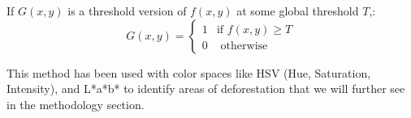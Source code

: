 \documentclass[12pt,a4paper,IEEEtran]{article}
\begin{document}
If $G(x,y)$ is a threshold version of $f(x,y)$ at some global threshold $T$,:
\[G(x,y) =
\begin{cases}
1 & \text{if } f(x,y) \geq T\\
0 & \text{ otherwise}
\end{cases}
\]

This method has been used with color spaces like HSV (Hue, Saturation, Intensity), and L*a*b* to identify areas of deforestation that we will further see in the methodology section.








\end{document}
